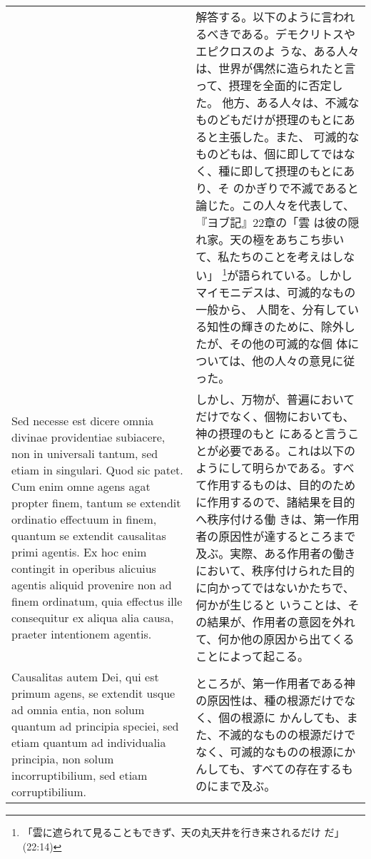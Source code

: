 \documentclass[10pt]{jsarticle} %
\begin{document}
\begin{longtable}{p{21em}p{21em}}
&

解答する。以下のように言われるべきである。デモクリトスやエピクロスのよ
うな、ある人々は、世界が偶然に造られたと言って、摂理を全面的に否定した。
他方、ある人々は、不滅なものどもだけが摂理のもとにあると主張した。また、
可滅的なものどもは、個に即してではなく、種に即して摂理のもとにあり、そ
のかぎりで不滅であると論じた。この人々を代表して、『ヨブ記』22章の「雲
は彼の隠れ家。天の極をあちこち歩いて、私たちのことを考えはしない」
\footnote{「雲に遮られて見ることもできず、天の丸天井を行き来されるだけ
だ」(22:14)}が語られている。しかしマイモニデスは、可滅的なもの一般から、
人間を、分有している知性の輝きのために、除外したが、その他の可滅的な個
体については、他の人々の意見に従った。


\\



Sed necesse est dicere omnia divinae providentiae
subiacere, non in universali tantum, sed etiam in singulari. Quod sic
patet. Cum enim omne agens agat propter finem, tantum se extendit
ordinatio effectuum in finem, quantum se extendit causalitas primi
agentis. 
Ex hoc enim contingit in operibus alicuius agentis aliquid
provenire non ad finem ordinatum, quia effectus ille consequitur ex
aliqua alia causa, praeter intentionem agentis.

&

しかし、万物が、普遍においてだけでなく、個物においても、神の摂理のもと
にあると言うことが必要である。これは以下のようにして明らかである。すべ
て作用するものは、目的のために作用するので、諸結果を目的へ秩序付ける働
きは、第一作用者の原因性が達するところまで及ぶ。実際、ある作用者の働き
において、秩序付けられた目的に向かってではないかたちで、何かが生じると
いうことは、その結果が、作用者の意図を外れて、何か他の原因から出てくる
ことによって起こる。




\\


 Causalitas autem Dei,
qui est primum agens, se extendit usque ad omnia entia, non solum
quantum ad principia speciei, sed etiam quantum ad individualia
principia, non solum incorruptibilium, sed etiam corruptibilium.



&

ところが、第一作用者である神の原因性は、種の根源だけでなく、個の根源に
かんしても、また、不滅的なものの根源だけでなく、可滅的なものの根源にか
んしても、すべての存在するものにまで及ぶ。



\end{longtable}
\end{document}
